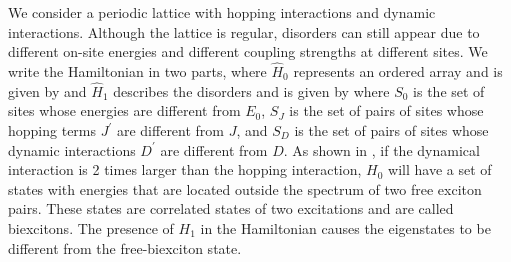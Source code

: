 We consider a periodic lattice with hopping interactions and dynamic interactions. Although 
the lattice is regular, disorders can still appear due to different on-site energies and different coupling strengths at 
different sites. 
We write the Hamiltonian in two parts, 
where $\hat{H}_0$ represents an ordered array and is given by
and $\hat{H}_1$ describes the disorders and is given by
where $S_0$ is the set of sites whose energies are different from $E_0$, $S_J$ is the set of pairs of sites whose 
hopping terms 
$J^{\prime}$ are different from $J$, and $S_D$ is the set of pairs of sites whose dynamic interactions 
$D^{\prime}$ are different from $D$. 
As shown in , if the dynamical interaction is 2 times larger than the hopping interaction,  $H_0$
will have a set of states with energies that are located outside the spectrum of two free exciton pairs. These states
are correlated  states of two excitations and are called biexcitons. The presence of $H_1$ in the Hamiltonian causes 
the eigenstates to be different from the free-biexciton state.

